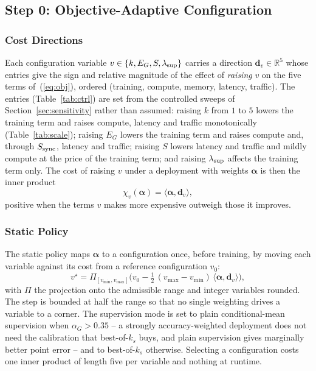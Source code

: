 \documentclass[journal]{IEEEtran}
\newcommand{\valpha}{\boldsymbol{\alpha}}
\newcommand{\vd}{\mathbf{d}}
\begin{document}
\subsection{Step 0: Objective-Adaptive Configuration}
\label{sec:controller}
\subsubsection{Cost Directions}
Each configuration variable $v\in\{k,E_G,S,\lambda_{\rm sup}\}$ carries a
direction $\vd_v\in\mathbb{R}^5$ whose entries give the sign and relative
magnitude of the effect of \emph{raising} $v$ on the five terms
of~(\ref{eq:obj}), ordered (training, compute, memory, latency, traffic).
The entries (Table~\ref{tab:ctrl}) are set from the controlled sweeps of
Section~\ref{sec:sensitivity} rather than assumed: raising $k$ from $1$ to $5$
lowers the training term and raises compute, latency and traffic monotonically
(Table~\ref{tab:scale}); raising $E_G$ lowers the training term and raises
compute and, through $S_{\rm sync}$, latency and traffic; raising $S$ lowers
latency and traffic and mildly compute at the price of the training term; and
raising $\lambda_{\rm sup}$ affects the training term only. The cost of raising
$v$ under a deployment with weights $\valpha$ is then the inner product
\begin{equation}
\chi_v(\valpha)=\langle\valpha,\vd_v\rangle,
\label{eq:direction}
\end{equation}
positive when the terms $v$ makes more expensive outweigh those it improves.

\subsubsection{Static Policy}
The static policy maps $\valpha$ to a configuration once, before training, by
moving each variable against its cost from a reference configuration $v_0$:
\begin{equation}
v^{\star}=\Pi_{[v_{\min},v_{\max}]}\Big(v_0-\tfrac12\,(v_{\max}-v_{\min})\,
 \langle\valpha,\vd_v\rangle\Big),
\label{eq:policy}
\end{equation}
with $\Pi$ the projection onto the admissible range and integer variables
rounded. The step is bounded at half the range so that no single weighting
drives a variable to a corner. The supervision mode is set to plain
conditional-mean supervision when $\alpha_G>0.35$ -- a strongly
accuracy-weighted deployment does not need the calibration that
best-of-$k_s$ buys, and plain supervision gives marginally better point error --
and to best-of-$k_s$ otherwise. Selecting a configuration costs one inner
product of length five per variable and nothing at runtime.
\end{document}
